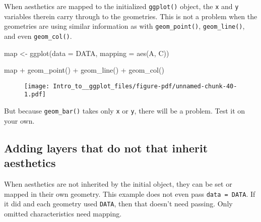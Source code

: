 \documentclass[
  letterpaper,
  DIV=11,
  numbers=noendperiod]{scrartcl}
\newenvironment{Shaded}{\begin{snugshade}}{\end{snugshade}}
\newcommand{\AttributeTok}[1]{\textcolor[rgb]{0.40,0.45,0.13}{#1}}
\newcommand{\FunctionTok}[1]{\textcolor[rgb]{0.28,0.35,0.67}{#1}}
\newcommand{\NormalTok}[1]{\textcolor[rgb]{0.00,0.23,0.31}{#1}}
\newcommand{\OtherTok}[1]{\textcolor[rgb]{0.00,0.23,0.31}{#1}}
\newcommand{\SpecialCharTok}[1]{\textcolor[rgb]{0.37,0.37,0.37}{#1}}
\begin{document}
When aesthetics are mapped to the initialized \texttt{ggplot()} object,
the \texttt{x} and \texttt{y} variables therein carry through to the
geometries. This is not a problem when the geometries are using similar
information as with \texttt{geom\_point()}, \texttt{geom\_line()}, and
even \texttt{geom\_col()}.

\begin{Shaded}
\begin{Highlighting}[]
\NormalTok{map }\OtherTok{\textless{}{-}} \FunctionTok{ggplot}\NormalTok{(}\AttributeTok{data =}\NormalTok{ DATA, }
              \AttributeTok{mapping =} \FunctionTok{aes}\NormalTok{(A, C))}

\NormalTok{map }\SpecialCharTok{+} 
  \FunctionTok{geom\_point}\NormalTok{() }\SpecialCharTok{+}
  \FunctionTok{geom\_line}\NormalTok{() }\SpecialCharTok{+}
  \FunctionTok{geom\_col}\NormalTok{()}
\end{Highlighting}
\end{Shaded}

\begin{figure}[H]

{\centering \texttt{[image: Intro\_to\_\_ggplot\_files/figure-pdf/unnamed-chunk-40-1.pdf]}

}

\end{figure}

But because \texttt{geom\_bar()} takes only \texttt{x} or \texttt{y},
there will be a problem. Test it on your own.

\hypertarget{adding-layers-that-do-not-that-inherit-aesthetics}{%
\subsection{Adding layers that do not that inherit
aesthetics}\label{adding-layers-that-do-not-that-inherit-aesthetics}}

When aesthetics are not inherited by the initial object, they can be set
or mapped in their own geometry. This example does not even pass
\texttt{data\ =\ DATA}. If it did and each geometry used \texttt{DATA},
then that doesn't need passing. Only omitted characteristics need
mapping.
\end{document}
